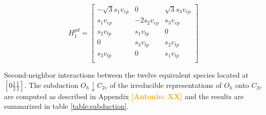 \documentclass[twocolumn,showpacs,preprintnumbers,superscriptaddress,prb,floatfix,aps,10pt]{revtex4-1}
\newcommand{\abmei}[1]{\textcolor{orange}{ \bf [Antonio: #1] }}
\begin{document}
\begin{equation}
H_1^{pd} = 
\begin{bmatrix}
-\sqrt{3} s_1 v_{ep} & 0            & \sqrt{3} s_3 v_{ep}  \\ %
 s_1 v_{ep}          &-2 s_2 v_{ep} &  s_3 v_{ep}          \\ %
 s_2 v_{tp}          &  s_1 v_{tp}  & 0                    \\
0                    &  s_3 v_{tp}  &  s_2 v_{tp}          \\
 s_3 v_{tp}          & 0            &  s_1 v_{tp}          \\
\end{bmatrix}
\end{equation}

Second-neighbor interactions between the twelve equivalent species located at $[0\frac{1}{2}\frac{1}{2}]$. The subduction $O_h\downarrow C_{2v}$ of the irreducible representations of $O_h$ onto $C_{2v}$ are computed as described in Appendix \abmei{XX} and the results are summarized in table \ref{table:subduction}. 
\end{document}
